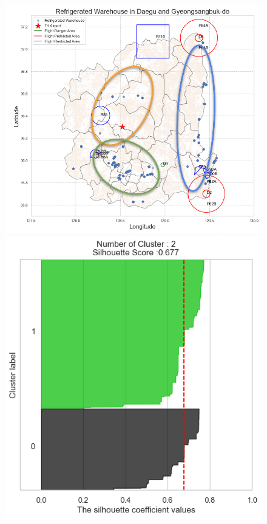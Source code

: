 \documentclass[11pt]{article}
\begin{document}
    \begin{figure}[H]
      \centering
      \begin{minipage}{0.32\textwidth}
        \centering
        \includegraphics[width=\linewidth]{figure/eye_inspection.png}
      \end{minipage}%
      \begin{minipage}{0.32\textwidth}
        \centering
        \includegraphics[width=\linewidth]{figure/silhouette_2.png}

\end{minipage}
\end{figure}
\end{document}
